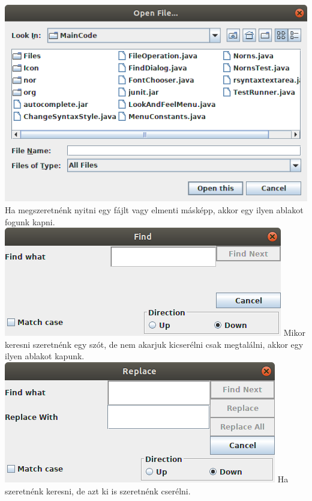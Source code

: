 \documentclass[12pt]{article}
\begin{document}
\includegraphics[width = \textwidth]{OpenFile}
Ha megszeretnénk nyitni egy fájlt vagy elmenti másképp, akkor egy ilyen ablakot
fogunk kapni. \\

\includegraphics[width = \textwidth]{FindMenu}
Mikor keresni szeretnénk egy szót, de nem akarjuk kicserélni csak megtalálni,
akkor egy ilyen ablakot kapunk.\\

\includegraphics[width = \textwidth]{FindReplace}
Ha szeretnénk keresni, de azt ki is szeretnénk cserélni.\\
\end{document}
